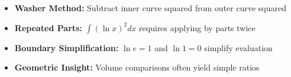 \begin{takeaways}
\begin{itemize}
\item \textbf{Washer Method:} Subtract inner curve squared from outer curve squared
\item \textbf{Repeated Parts:} $\int (\ln x)^2 dx$ requires applying by parts twice
\item \textbf{Boundary Simplification:} $\ln e = 1$ and $\ln 1 = 0$ simplify evaluation
\item \textbf{Geometric Insight:} Volume comparisons often yield simple ratios
\end{itemize}
\end{takeaways}
